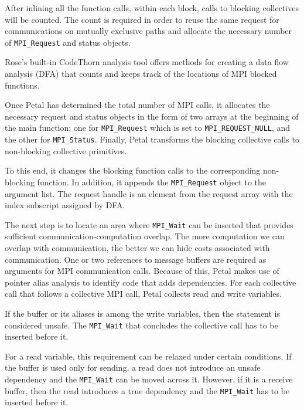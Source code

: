 After inlining all the function calls, within each block, calls to blocking collectives will be counted. 
The count is required in order to reuse the same request for communications on mutually exclusive paths and allocate the necessary number of \texttt{MPI\_Request} and status objects. 

Rose's built-in CodeThorn \cite{margaria_verification_2014} analysis tool offers methods for creating a data flow analysis (DFA) that counts and keeps track of the locations of MPI blocked functions. 

Once Petal has determined the total number of MPI calls, it allocates the necessary request and status objects in the form of two arrays at the beginning of the main function; one for \texttt{MPI\_Request} which is set to \texttt{MPI\_REQUEST\_NULL}, and the other for \texttt{MPI\_Status}. Finally, Petal transforms the blocking collective calls to non-blocking collective primitives. 

To this end, it changes the blocking function calls to the corresponding non-blocking function. In addition, it appends the \texttt{MPI\_Request} object to the argument list. The request handle is an element from the request array with the index subscript assigned by DFA.

The next step is to locate an area where \texttt{MPI\_Wait} can be inserted that provides sufficient communication-computation overlap. 
The more computation we can overlap with communication, the better we can hide costs associated with communication.
One or two references to message buffers are required as arguments for MPI communication calls. Because of this, Petal makes use of pointer alias analysis to identify code that adds dependencies.  
For each collective call that follows a collective MPI call, Petal collects read and write variables.

If the buffer or its aliases is among the write variables, then the statement is considered unsafe. 
The \texttt{MPI\_Wait} that concludes the collective call has to be inserted before it.

For a read variable, this requirement can be relaxed under certain conditions. If the buffer is used only for sending, a read does not introduce an unsafe dependency and the \texttt{MPI\_Wait} can be moved across it. However, if it is a receive buffer, then the read introduces a true dependency and the \texttt{MPI\_Wait} has to be inserted before it.




